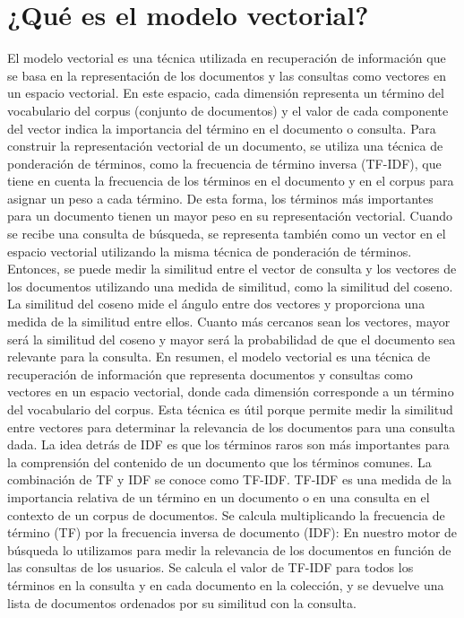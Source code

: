 \documentclass[12]{article}
\begin{document}
\section{¿Qué es el modelo vectorial?}
El modelo vectorial es una técnica utilizada en recuperación de información que se basa en la 
representación de los documentos y las consultas como vectores en un espacio vectorial. En 
este espacio, cada dimensión representa un término del vocabulario del corpus (conjunto de 
documentos) y el valor de cada componente del vector indica la importancia del término en el 
documento o consulta. Para construir la representación vectorial de un documento, se utiliza 
una técnica de ponderación de términos, como la frecuencia de término inversa (TF-IDF), que 
tiene en cuenta la frecuencia de los términos en el documento y en el corpus para asignar un 
peso a cada término. De esta forma, los términos más importantes para un documento tienen 
un mayor peso en su representación vectorial. Cuando se recibe una consulta de búsqueda, se 
representa también como un vector en el espacio vectorial utilizando la misma técnica de 
ponderación de términos. Entonces, se puede medir la similitud entre el vector de consulta y 
los vectores de los documentos utilizando una medida de similitud, como la similitud del 
coseno. La similitud del coseno mide el ángulo entre dos vectores y proporciona una medida 
de la similitud entre ellos. Cuanto más cercanos sean los vectores, mayor será la similitud del 
coseno y mayor será la probabilidad de que el documento sea relevante para la consulta.
En resumen, el modelo vectorial es una técnica de recuperación de información que 
representa documentos y consultas como vectores en un espacio vectorial, donde cada 
dimensión corresponde a un término del vocabulario del corpus. Esta técnica es útil porque 
permite medir la similitud entre vectores para determinar la relevancia de los documentos 
para una consulta dada.
La idea detrás de IDF es que los términos raros son más importantes para la comprensión del 
contenido de un documento que los términos comunes.
La combinación de TF y IDF se conoce como TF-IDF. TF-IDF es una medida de la importancia 
relativa de un término en un documento o en una consulta en el contexto de un corpus de 
documentos. Se calcula multiplicando la frecuencia de término (TF) por la frecuencia inversa 
de documento (IDF):
En nuestro motor de búsqueda lo utilizamos para medir la relevancia de los documentos en 
función de las consultas de los usuarios. Se calcula el valor de TF-IDF para todos los términos 
en la consulta y en cada documento en la colección, y se devuelve una lista de documentos 
ordenados por su similitud con la consulta.
\newpage
\end{document}
